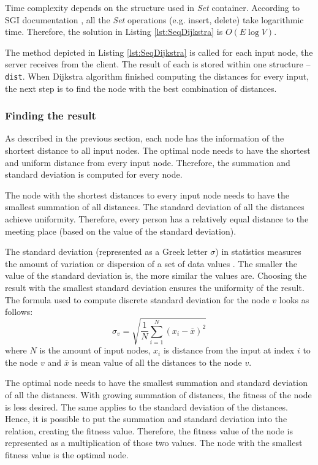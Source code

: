 \documentclass[thesis=M,english]{FITthesis}[2012/10/20]
\begin{document}
Time complexity depends on the structure used in \textit{Set} container. According to SGI documentation \cite{STL17}, all the \textit{Set} operations (e.g. insert, delete) take logarithmic time. Therefore, the solution in Listing \ref{lst:SeqDijkstra} is $O(E \log V)$.

The method depicted in Listing \ref{lst:SeqDijkstra} is called for each input node, the server receives from the client. The result of each is stored within one structure -- \texttt{dist}. When Dijkstra algorithm finished computing the distances for every input, the next step is to find the node with the best combination of distances.

\subsubsection{Finding the result}

As described in the previous section, each node has the information of the shortest distance to all input nodes. The optimal node needs to have the shortest and uniform distance from every input node. Therefore, the summation and standard deviation is computed for every node. 

The node with the shortest distances to every input node needs to have the smallest summation of all distances. The standard deviation of all the distances achieve uniformity. Therefore, every person has a relatively equal distance to the meeting place (based on the value of the standard deviation). 

The standard deviation (represented as a Greek letter $\sigma$) in statistics measures the amount of variation or dispersion of a set of data values \cite{Bland96}. The smaller the value of the standard deviation is, the more similar the values are. Choosing the result with the smallest standard deviation ensures the uniformity of the result.
The formula used to compute discrete standard deviation for the node $v$ looks as follows:
$$
	\sigma_v = \sqrt{\frac{1}{N} \sum_{i=1}^{N} (x_i - \overline{x})^2}
$$
where $N$ is the amount of input nodes,  $x_i$ is distance from the input at index $i$ to the node $v$ and $\overline{x}$ is mean value of all the distances to the node $v$. 

The optimal node needs to have the smallest summation and standard deviation of all the distances. With growing summation of distances, the fitness of the node is less desired. The same applies to the standard deviation of the distances. Hence, it is possible to put the summation and standard deviation into the relation, creating the fitness value. Therefore, the fitness value of the node is represented as a multiplication of those two values. The node with the smallest fitness value is the optimal node. 
\end{document}
